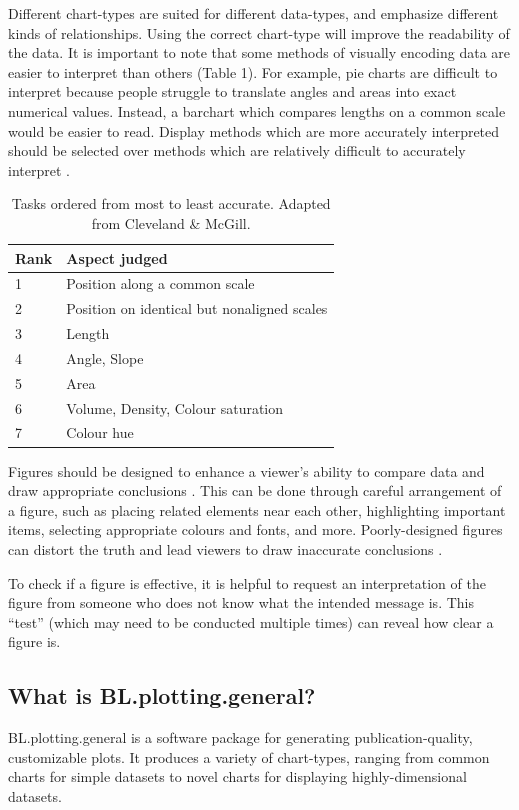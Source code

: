 \documentclass[letterpaper]{report}\usepackage[]{graphicx}\usepackage[]{color}
\begin{document}
Different chart-types are suited for different data-types, and emphasize different kinds of relationships. Using the correct chart-type will improve the readability of the data. It is important to note that some methods of visually encoding data are easier to interpret than others (Table 1). For example, pie charts are difficult to interpret because people struggle to translate angles and areas into exact numerical values. Instead, a barchart which compares lengths on a common scale would be easier to read. Display methods which are more accurately interpreted should be selected over methods which are relatively difficult to accurately interpret \cite{wong1, cleveland}. 

\begin{table}
\begin{center}
\begin{tabular}{ l  l }
\hline
Rank & Aspect judged\\
\hline
1 & Position along a common scale\\
2 & Position on identical but nonaligned scales\\
3 & Length \\
4 & Angle, Slope\\
5 & Area\\
6 & Volume, Density, Colour saturation\\
7 & Colour hue\\
\end{tabular}
\end{center}
\caption{Tasks ordered from most to least accurate. Adapted from Cleveland \& McGill.}
\end{table}

Figures should be designed to enhance a viewer's ability to compare data and draw appropriate conclusions \cite{tufte}. This can be done through careful arrangement of a figure, such as placing related elements near each other, highlighting important items, selecting appropriate colours and fonts, and more. Poorly-designed figures can distort the truth and lead viewers to draw inaccurate conclusions \cite{tufte}. 

To check if a figure is effective, it is helpful to request an interpretation of the figure from someone who does not know what the intended message is. This ``test'' (which may need to be conducted multiple times) can reveal how clear a figure is.

\subsection{What is BL.plotting.general?}
BL.plotting.general is a software package for generating publication-quality, customizable plots. It produces a variety of chart-types, ranging from common charts for simple datasets to novel charts for displaying highly-dimensional datasets.
\end{document}
